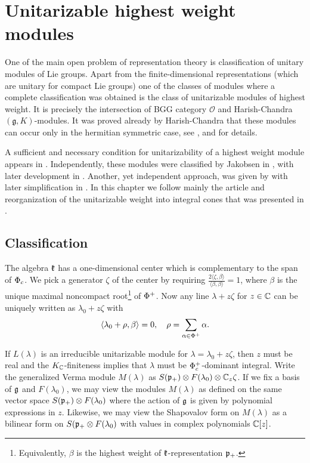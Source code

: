 \chapter{Unitarizable highest weight modules}

One of the main open problem of representation theory is classification of unitary modules of Lie groups. Apart from the finite-dimensional representations (which are unitary for compact Lie groups) one of the classes of modules where a complete classification was obtained is the class of unitarizable modules of highest weight. It is precisely the intersection of BGG category $\mathcal{O}$ and Harish-Chandra $(\mathfrak{g}, K)$-modules. It was proved already by Harish-Chandra that these modules can occur only in the hermitian symmetric case, see \cite{harish-chandra_representations_1955}, \cite{harish-chandra_representations_1956-1} and \cite{harish-chandra_representations_1956} for details.

A sufficient and necessary condition for unitarizability of a highest weight module appears in \cite{garland_unitarizable_1981}. Independently, these modules were classified by Jakobsen in \cite{jakobsen_last_1981}, \cite{jakobsen_hermitian_1983} with later development in \cite{jakobsen_intrinsic_1996}. Another, yet independent approach, was given by \cite{enright_classification_1983} with later simplification in \cite{joseph_annihilators_1992}. In this chapter we follow mainly the article \cite{enright_classification_1983} and reorganization of the unitarizable weight into integral cones that was presented in \cite{davidson_differential_1991}. 

\section{Classification}

The algebra $\mathfrak{k}$ has a one-dimensional center which is complementary to the span of $\Phi_c$. We pick a generator $\zeta$ of the center by requiring $\frac{2 \langle \zeta,\beta \rangle}{\langle \beta, \beta \rangle} = 1$, where $\beta$ is the unique maximal noncompact root\footnote{Equivalently, $\beta$ is the highest weight of $\mathfrak{k}$-representation $\mathfrak{p}_+$.} of $\Phi^+$. Now any line $\lambda+z\zeta$ for $z\in\mathbb{C}$ can be uniquely written as $\lambda_0 + z\zeta$ with
\[
 \langle \lambda_0 + \rho,\beta \rangle = 0, \quad \rho =\sum_{\alpha\in\Phi^+} \alpha.
\]

If $L(\lambda)$ is an irreducible unitarizable module for $\lambda=\lambda_0+z\zeta$, then $z$ must be real and the $K_{\mathbb{C}}$-finiteness implies that $\lambda$ must be $\Phi^+_c$-dominant integral. Write the generalized Verma module $M(\lambda)$ as $S(\mathfrak{p}_+)\otimes F(\lambda_0) \otimes \mathbb{C}_z\zeta$. If we fix a basis of $\mathfrak{g}$ and $F(\lambda_0)$, we may view the modules $M(\lambda)$ as defined on the same vector space $S(\mathfrak{p}_+)\otimes F(\lambda_0)$ where the action of $\mathfrak{g}$ is given by polynomial expressions in $z$. Likewise, we may view the Shapovalov form on $M(\lambda)$ as a bilinear form on $S(\mathfrak{p}_+\otimes F(\lambda_0)$ with values in complex polynomials $\mathbb{C}[z]$.

